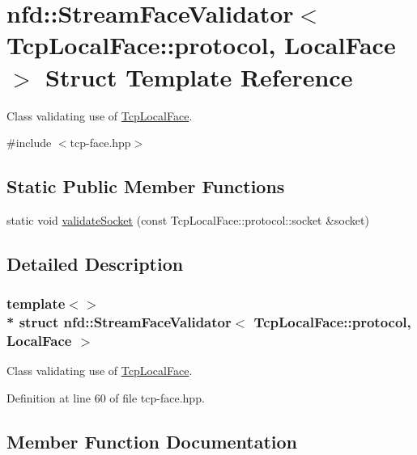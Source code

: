 \hypertarget{structnfd_1_1StreamFaceValidator_3_01TcpLocalFace_1_1protocol_00_01LocalFace_01_4}{}\section{nfd\+:\+:Stream\+Face\+Validator$<$ Tcp\+Local\+Face\+:\+:protocol, Local\+Face $>$ Struct Template Reference}
\label{structnfd_1_1StreamFaceValidator_3_01TcpLocalFace_1_1protocol_00_01LocalFace_01_4}


Class validating use of \hyperlink{classnfd_1_1TcpLocalFace}{Tcp\+Local\+Face}.  




{\ttfamily \#include $<$tcp-\/face.\+hpp$>$}

\subsection*{Static Public Member Functions}
\begin{DoxyCompactItemize}
\item 
static void \hyperlink{structnfd_1_1StreamFaceValidator_3_01TcpLocalFace_1_1protocol_00_01LocalFace_01_4_abf7f3c391dc9c8b1c8bb793e9008447e}{validate\+Socket} (const Tcp\+Local\+Face\+::protocol\+::socket \&socket)
\end{DoxyCompactItemize}


\subsection{Detailed Description}
\subsubsection*{template$<$$>$\\*
struct nfd\+::\+Stream\+Face\+Validator$<$ Tcp\+Local\+Face\+::protocol, Local\+Face $>$}

Class validating use of \hyperlink{classnfd_1_1TcpLocalFace}{Tcp\+Local\+Face}. 

Definition at line 60 of file tcp-\/face.\+hpp.



\subsection{Member Function Documentation}
